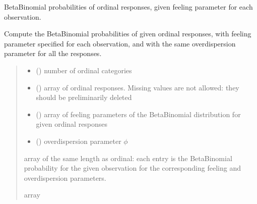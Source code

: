 \documentclass[letterpaper,10pt,english]{sphinxmanual}
\begin{document}
\begin{fulllineitems}
\label{\detokenize{cubmods:cubmods.cube_0w0.betabinomialxi}}
\pysigstartsignatures
{}
\pysigstopsignatures
\sphinxAtStartPar
Beta\sphinxhyphen{}Binomial probabilities of ordinal responses, given feeling parameter for each observation.

\sphinxAtStartPar
Compute the Beta\sphinxhyphen{}Binomial probabilities of given ordinal responses, with feeling 
parameter specified for each observation, 
and with the same overdispersion parameter for all the responses.
\begin{quote}\begin{description}
\begin{itemize}
\item {} 
\sphinxAtStartPar
{} () \textendash{} number of ordinal categories

\item {} 
\sphinxAtStartPar
{} () \textendash{} array of ordinal responses. Missing values are not allowed: they should be preliminarily deleted

\item {} 
\sphinxAtStartPar
{} () \textendash{} array of feeling parameters of the Beta\sphinxhyphen{}Binomial distribution for given ordinal responses

\item {} 
\sphinxAtStartPar
{} () \textendash{} overdispersion parameter \(\phi\)

\end{itemize}

\sphinxAtStartPar
array of the same length as ordinal: each entry is the Beta\sphinxhyphen{}Binomial probability for the given observation 
for the corresponding feeling and overdispersion parameters.

\sphinxAtStartPar
array

\end{description}\end{quote}

\end{fulllineitems}
\end{document}
